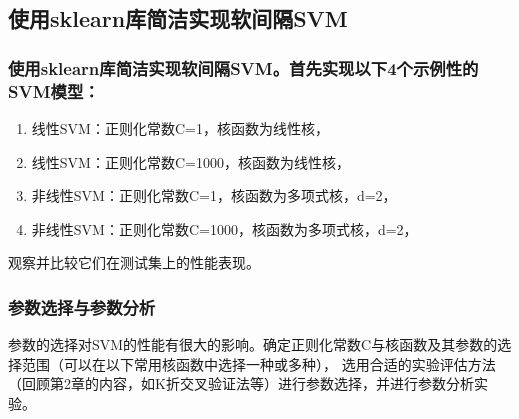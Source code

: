 \documentclass[12pt]{article}
\begin{document}
\subsection{使用sklearn库简洁实现软间隔SVM}
\subsubsection{使用sklearn库简洁实现软间隔SVM。首先实现以下4个示例性的SVM模型：}

\begin{enumerate}
  \item 线性SVM：正则化常数C=1，核函数为线性核，
  \item 线性SVM：正则化常数C=1000，核函数为线性核，
  \item 非线性SVM：正则化常数C=1，核函数为多项式核，d=2，
  \item 非线性SVM：正则化常数C=1000，核函数为多项式核，d=2，
\end{enumerate}
观察并比较它们在测试集上的性能表现。

\subsubsection{参数选择与参数分析}
参数的选择对SVM的性能有很大的影响。确定正则化常数C与核函数及其参数的选择范围（可以在以下常用核函数中选择一种或多种），
选用合适的实验评估方法（回顾第2章的内容，如K折交叉验证法等）进行参数选择，并进行参数分析实验。
\end{document}
